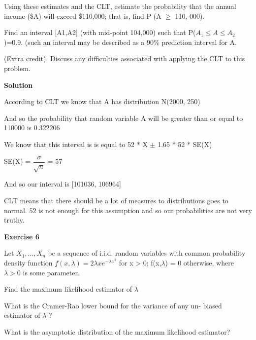 \documentclass[12pt]{article}
\begin{document}
\begin{list}{()~}{}
\item
Using these estimates and the CLT, estimate the probability that the annual income (\$A) will exceed \$110,000; that is, find P (A $\geqslant$ 110, 000).
\item
Find an interval [A1,A2] (with mid-point 104,000) such that P($A_1\leqslant A \leqslant A_2$)=0.9. (such an interval may be described as a 90\% prediction interval for A.
\item
(Extra credit). Discuss any difficulties associated with applying the CLT to this problem.
\end{list}

\medskip

\textbf{Solution}

\begin{list}{()~}{}
\item
According to CLT we know that A has distribution  N(2000, 250)

And so the probability that random variable A will be greater than or equal to 110000 is 0.322206
\item
We know that this interval is is equal to 52 * X $\pm$ 1.65 * 52 * SE(X)

SE(X) = $\dfrac{\sigma}{\sqrt{n}}$ = 57

And so our interval is [101036, 106964]
\item
CLT means that there should be a lot of measures to distributions goes to normal. 52 is not enough for this assumption and so our probabilities are not very truthy. 
\end{list}

\bigskip 

\textbf{Exercise 6}

Let $X_1,...,X_n$ be a sequence of i.i.d. random variables with common probability density function $f(x,\lambda) = 2\lambda xe^{-\lambda x^2}$
for x > 0; f(x,$\lambda$) = 0 otherwise, where $\lambda >0$ is some parameter.

\begin{list}{()~}{}
\item
Find the maximum likelihood estimator of $\lambda$
\item
What is the Cramer-Rao lower bound for the variance of any un-
biased estimator of $\lambda$ ?
\item
What is the asymptotic distribution of the maximum likelihood estimator?
\end{list}
\end{document}
